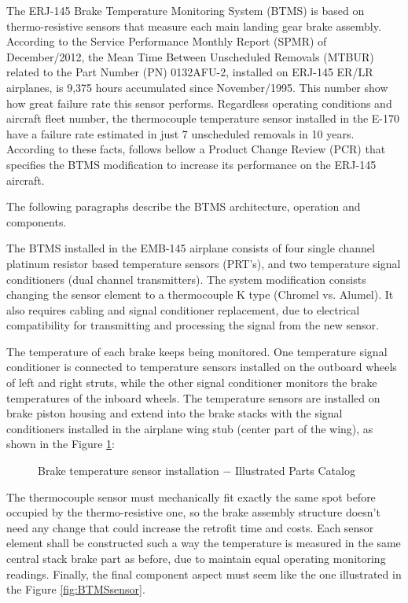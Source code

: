 The ERJ-145 Brake Temperature Monitoring System (BTMS) is based on thermo-resistive sensors that measure each main landing gear brake assembly. According to the Service Performance Monthly Report (SPMR) of December/2012, the Mean Time Between Unscheduled Removals (MTBUR) related to the Part Number (PN) 0132AFU-2, installed on ERJ-145 ER/LR airplanes, is 9,375 hours accumulated since November/1995. This number show how great failure rate this sensor performs. Regardless operating conditions and aircraft fleet number, the thermocouple temperature sensor installed in the E-170 have a failure rate estimated in just 7 unscheduled removals in 10 years. According to these facts, follows bellow a Product Change Review (PCR) that specifies the BTMS modification to increase its performance on the ERJ-145 aircraft.

The following paragraphs describe the BTMS architecture, operation and components.

The BTMS installed in the EMB-145 airplane consists of four single channel platinum resistor based temperature sensors (PRT's), and two temperature signal conditioners (dual channel transmitters). The system modification consists changing the sensor element to a thermocouple K type (Chromel vs. Alumel). It also requires cabling and signal conditioner replacement, due to electrical compatibility for transmitting and processing the signal from the new sensor.

The temperature of each brake keeps being monitored. One temperature signal conditioner is connected to temperature sensors installed on the outboard wheels of left and right struts, while the other signal conditioner monitors the brake temperatures of the inboard wheels. The temperature sensors are installed on brake piston housing and extend into the brake stacks with the signal conditioners installed in the airplane wing stub (center part of the wing), as shown in the Figure \ref{fig:BTMSassembly}:

\begin{figure}[H] %
    \caption{Brake temperature sensor installation $-$ Illustrated Parts Catalog}
    \label{fig:BTMSassembly}
\end{figure}


The thermocouple sensor must mechanically fit exactly the same spot before occupied by the thermo-resistive one, so the brake assembly structure doesn't need any change that could increase the retrofit time and costs. Each sensor element shall be constructed such a way the temperature is measured in the same central stack brake part as before, due to maintain equal operating monitoring readings. Finally, the final component aspect must seem like the one illustrated in the Figure \ref{fig:BTMSsensor}.

